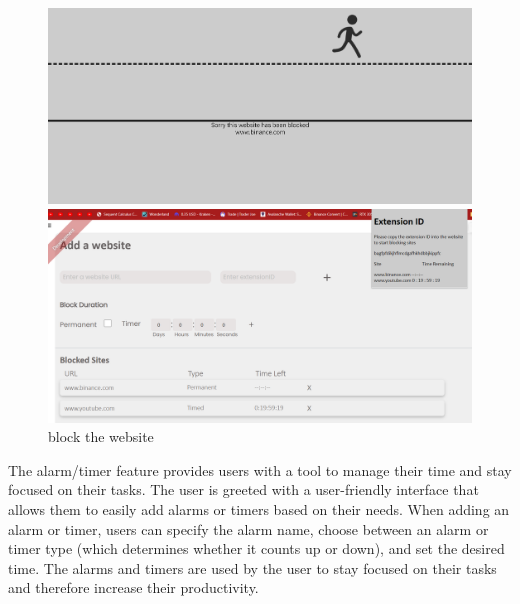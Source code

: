 \documentclass[a4paper]{article}
\begin{document}
\begin{figure}[H]
    \centering
    \begin{minipage}{0.49\textwidth}
      \centering
      \includegraphics[width=\linewidth]{./image/BlockedWebsite.png}
    \end{minipage}\hfill
    \begin{minipage}{0.49\textwidth}
      \centering
      \includegraphics[width=\linewidth]{./image/AntiProcr.png}
    \end{minipage}
    \caption*{block the website}
\end{figure}

The alarm/timer feature provides users with a tool to manage their time and stay focused on their tasks. The user is greeted with a user-friendly interface that allows them to easily add alarms or timers based on their needs. When adding an alarm or timer, users can specify the alarm name, choose between an alarm or timer type (which determines whether it counts up or down), and set the desired time. The alarms and timers are used by the user to stay focused on their tasks and therefore increase their productivity.
\end{document}
